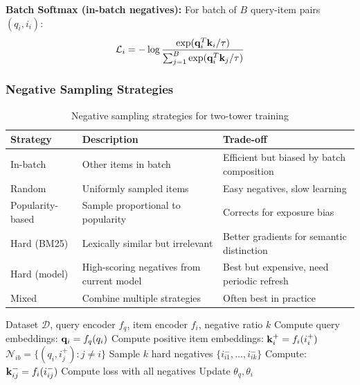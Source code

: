 \textbf{Batch Softmax (in-batch negatives):}
For batch of $B$ query-item pairs $(q_i, i_i)$:
\begin{equation}
\mathcal{L}_i = -\log \frac{\exp(\mathbf{q}_i^T \mathbf{k}_i / \tau)}{\sum_{j=1}^{B} \exp(\mathbf{q}_i^T \mathbf{k}_j / \tau)}
\end{equation}

\subsubsection{Negative Sampling Strategies}

\begin{table}[H]
\centering
\caption{Negative sampling strategies for two-tower training}
\begin{tabularx}{\textwidth}{lXX}
\toprule
\textbf{Strategy} & \textbf{Description} & \textbf{Trade-off} \\
\midrule
In-batch & Other items in batch & Efficient but biased by batch composition \\
Random & Uniformly sampled items & Easy negatives, slow learning \\
Popularity-based & Sample proportional to popularity & Corrects for exposure bias \\
Hard (BM25) & Lexically similar but irrelevant & Better gradients for semantic distinction \\
Hard (model) & High-scoring negatives from current model & Best but expensive, need periodic refresh \\
Mixed & Combine multiple strategies & Often best in practice \\
\bottomrule
\end{tabularx}
\end{table}

\begin{algorithm}[H]
\caption{Two-Tower Training with Mixed Negatives}
\begin{algorithmic}[1]
\REQUIRE Dataset $\mathcal{D}$, query encoder $f_q$, item encoder $f_i$, negative ratio $k$
    \STATE Compute query embeddings: $\mathbf{q}_i = f_q(q_i)$
    \STATE Compute positive item embeddings: $\mathbf{k}_i^+ = f_i(i_i^+)$
    \STATE {}
    \STATE $\mathcal{N}_{ib} = \{(q_i, i_j^+) : j \neq i\}$
    \STATE {}
        \STATE Sample $k$ hard negatives $\{i_{i1}^-, \ldots, i_{ik}^-\}$
        \STATE Compute: $\mathbf{k}_{ij}^- = f_i(i_{ij}^-)$
    \ENDFOR
    \STATE Compute loss with all negatives
    \STATE Update $\theta_q, \theta_i$
\ENDFOR
\end{algorithmic}
\end{algorithm}

